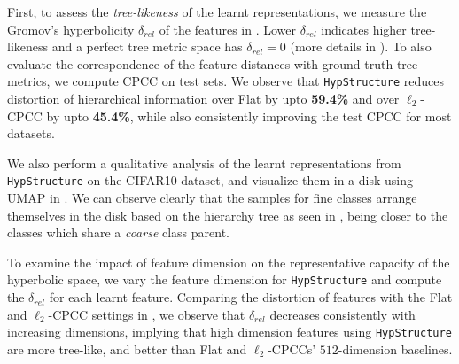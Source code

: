 First, to assess the \emph{tree-likeness} of the learnt representations, we measure the Gromov's hyperbolicity $\delta_{rel}$ \citep{gromov1987hyperbolic, adcock2013tree, jonckheere2008scaled, khrulkov2020hyperbolic} of the features in . Lower $\delta_{rel}$ indicates higher tree-likeness and a perfect tree metric space has $\delta_{rel}=0$ (more details in ). To also evaluate the correspondence of the feature distances with ground truth tree metrics, we compute CPCC on test sets. We observe that \texttt{HypStructure} reduces distortion of hierarchical information over Flat by upto \textbf{59.4\%} and over $\ell_2$-CPCC by upto \textbf{45.4\%}, while also consistently improving the test CPCC for most datasets. 

We also perform a qualitative analysis of the learnt representations from \texttt{HypStructure} on the CIFAR10 dataset, and visualize them in a \Poincare disk using UMAP \citep{mcinnes2018umap} in . We can observe clearly that the samples for fine classes arrange themselves in the \Poincare disk based on the hierarchy tree as seen in , being closer to the classes which share a \emph{coarse} class parent.

To examine the impact of feature dimension on the representative capacity of the hyperbolic space, we vary the feature dimension for \texttt{HypStructure} and compute the $\delta_{rel}$ for each learnt feature. Comparing the distortion of features with the Flat and $\ell_2$-CPCC settings in ,  we observe that $\delta_{rel}$ decreases consistently with increasing dimensions, implying that high dimension features using \texttt{HypStructure} are more tree-like, and better than Flat and $\ell_2$-CPCCs' $512$-dimension baselines.

